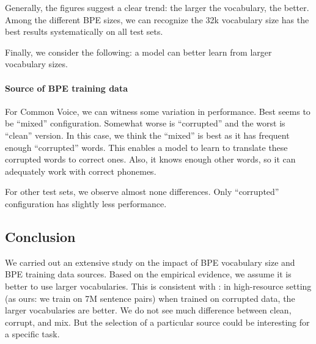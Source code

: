 Generally, the figures suggest a clear trend: the larger the vocabulary, the better. Among the different BPE sizes, we can recognize the 32k vocabulary size has the best results systematically on all test sets.

Finally, we consider the following: a model can better learn from larger vocabulary sizes. 

\paragraph{Source of BPE training data}
For Common Voice, we can witness some variation in performance. Best seems to be ``mixed'' configuration. Somewhat worse is ``corrupted'' and the worst is ``clean'' version. In this case, we think the ``mixed'' is best as it has frequent enough ``corrupted'' words. This enables a model to learn to translate these corrupted words to correct ones. Also, it knows enough other words, so it can adequately work with correct phonemes.

For other test sets, we observe almost none differences. Only ``corrupted'' configuration has slightly less performance. 


\subsection{Conclusion}
We carried out an extensive study on the impact of BPE vocabulary size and BPE training data sources. Based on the empirical evidence, we assume it is better to use larger vocabularies. This is consistent with : in high-resource setting (as ours: we train on 7M sentence pairs) when trained on corrupted data, the larger vocabularies are better. We do not see much difference between clean, corrupt, and mix. But the selection of a particular source could be interesting for a specific task.

